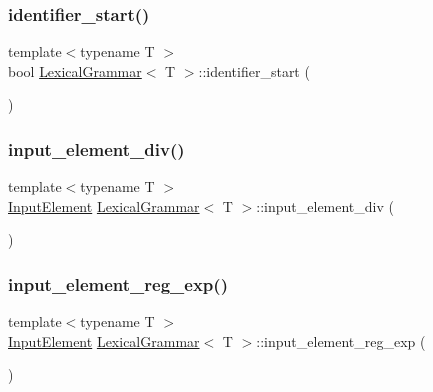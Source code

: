 \mbox{\label{class_lexical_grammar_af2c12dfb0b07685c3b01779e4ae4e359}} 
\subsubsection{\texorpdfstring{identifier\+\_\+start()}{identifier\_start()}}
{\footnotesize\ttfamily template$<$typename T $>$ \\
bool \hyperlink{class_lexical_grammar}{Lexical\+Grammar}$<$ T $>$\+::identifier\+\_\+start (\begin{DoxyParamCaption}{ }\end{DoxyParamCaption})\hspace{0.3cm}{\ttfamily [inline]}}

\mbox{\label{class_lexical_grammar_a6cb2dc7fbf0b773eb285bd70228abfd5}} 
\subsubsection{\texorpdfstring{input\+\_\+element\+\_\+div()}{input\_element\_div()}}
{\footnotesize\ttfamily template$<$typename T $>$ \\
\hyperlink{class_input_element}{Input\+Element} \hyperlink{class_lexical_grammar}{Lexical\+Grammar}$<$ T $>$\+::input\+\_\+element\+\_\+div (\begin{DoxyParamCaption}{ }\end{DoxyParamCaption})\hspace{0.3cm}{\ttfamily [inline]}}

\mbox{\label{class_lexical_grammar_a9bb05f07c0d3941f11ac37d69e1e14fc}} 
\subsubsection{\texorpdfstring{input\+\_\+element\+\_\+reg\+\_\+exp()}{input\_element\_reg\_exp()}}
{\footnotesize\ttfamily template$<$typename T $>$ \\
\hyperlink{class_input_element}{Input\+Element} \hyperlink{class_lexical_grammar}{Lexical\+Grammar}$<$ T $>$\+::input\+\_\+element\+\_\+reg\+\_\+exp (\begin{DoxyParamCaption}{ }\end{DoxyParamCaption})\hspace{0.3cm}{\ttfamily [inline]}}

